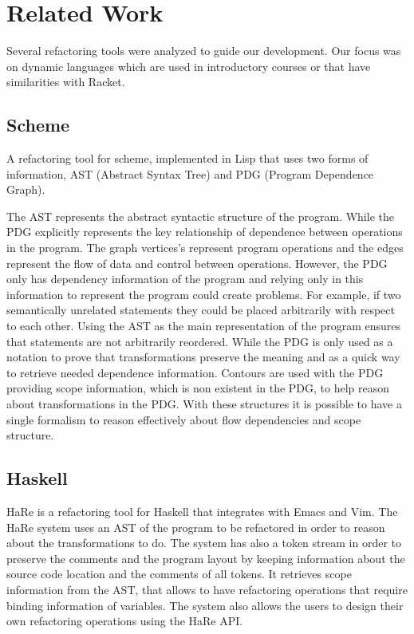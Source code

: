\section{Related Work}
\label{sec:Related-Work}
Several refactoring tools were analyzed to guide our development.
Our focus was on dynamic languages which are used in introductory courses or that have similarities
with Racket.

\subsection{Scheme}
A refactoring tool \cite{griswold1991program} for scheme, implemented in Lisp that
uses two forms of information, AST (Abstract Syntax Tree) and PDG (Program Dependence Graph).

The AST represents the abstract syntactic structure of the program.
While the PDG explicitly represents the key relationship of dependence between
operations in the program. %
The graph vertices's represent program operations and the edges represent the flow of
data and control between operations.
However, the PDG only has dependency information of the program and relying only
in this information to represent the program could create problems.
For example, if two semantically unrelated statements they could be placed arbitrarily with
respect to each other.
Using the AST as the main representation of the program ensures that statements
are not arbitrarily reordered.
While the PDG is only used as a notation to prove that transformations preserve
the meaning and as a quick way to retrieve needed dependence information.
Contours are used with the PDG providing scope information, which is non existent in the PDG,
to help reason about transformations in the PDG.
With these structures it is possible to have a single formalism to reason effectively
about flow dependencies and scope structure.
\subsection{Haskell}
HaRe \cite{thompson2005refactoring} is a refactoring tool for Haskell that
integrates with Emacs and Vim.
The HaRe system uses an AST of the program to be
refactored in order to reason about the transformations to do.
The system has also a token stream in order to preserve the comments and the
program layout by keeping information about the source code location and the comments of all tokens.
It retrieves scope information from the AST, that allows to have refactoring operations that
require binding information of variables. %
The system also allows the users to design their own refactoring operations
using the HaRe API.
